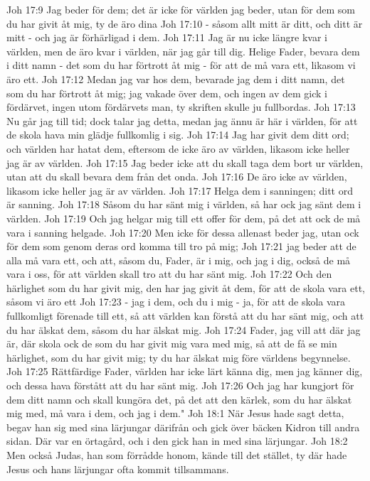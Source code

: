 Joh 17:9  Jag beder för dem; det är icke för världen jag beder, utan för dem som du har givit åt mig, ty de äro dina
Joh 17:10  - såsom allt mitt är ditt, och ditt är mitt - och jag är förhärligad i dem.
Joh 17:11  Jag är nu icke längre kvar i världen, men de äro kvar i världen, när jag går till dig. Helige Fader, bevara dem i ditt namn - det som du har förtrott åt mig - för att de må vara ett, likasom vi äro ett.
Joh 17:12  Medan jag var hos dem, bevarade jag dem i ditt namn, det som du har förtrott åt mig; jag vakade över dem, och ingen av dem gick i fördärvet, ingen utom fördärvets man, ty skriften skulle ju fullbordas.
Joh 17:13  Nu går jag till tid; dock talar jag detta, medan jag ännu är här i världen, för att de skola hava min glädje fullkomlig i sig.
Joh 17:14  Jag har givit dem ditt ord; och världen har hatat dem, eftersom de icke äro av världen, likasom icke heller jag är av världen.
Joh 17:15  Jag beder icke att du skall taga dem bort ur världen, utan att du skall bevara dem från det onda.
Joh 17:16  De äro icke av världen, likasom icke heller jag är av världen.
Joh 17:17  Helga dem i sanningen; ditt ord är sanning.
Joh 17:18  Såsom du har sänt mig i världen, så har ock jag sänt dem i världen.
Joh 17:19  Och jag helgar mig till ett offer för dem, på det att ock de må vara i sanning helgade.
Joh 17:20  Men icke för dessa allenast beder jag, utan ock för dem som genom deras ord komma till tro på mig;
Joh 17:21  jag beder att de alla må vara ett, och att, såsom du, Fader, är i mig, och jag i dig, också de må vara i oss, för att världen skall tro att du har sänt mig.
Joh 17:22  Och den härlighet som du har givit mig, den har jag givit åt dem, för att de skola vara ett, såsom vi äro ett
Joh 17:23  - jag i dem, och du i mig - ja, för att de skola vara fullkomligt förenade till ett, så att världen kan förstå att du har sänt mig, och att du har älskat dem, såsom du har älskat mig.
Joh 17:24  Fader, jag vill att där jag är, där skola ock de som du har givit mig vara med mig, så att de få se min härlighet, som du har givit mig; ty du har älskat mig före världens begynnelse.
Joh 17:25  Rättfärdige Fader, världen har icke lärt känna dig, men jag känner dig, och dessa hava förstått att du har sänt mig.
Joh 17:26  Och jag har kungjort för dem ditt namn och skall kungöra det, på det att den kärlek, som du har älskat mig med, må vara i dem, och jag i dem."
Joh 18:1  När Jesus hade sagt detta, begav han sig med sina lärjungar därifrån och gick över bäcken Kidron till andra sidan. Där var en örtagård, och i den gick han in med sina lärjungar.
Joh 18:2  Men också Judas, han som förrådde honom, kände till det stället, ty där hade Jesus och hans lärjungar ofta kommit tillsammans.
